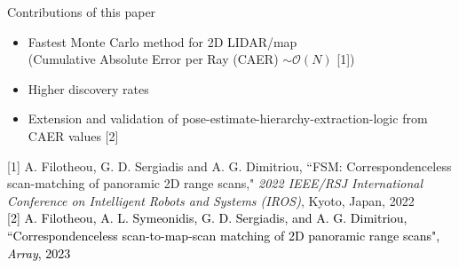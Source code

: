 \begin{frame}[noframenumbering]{Contributions of this paper}

  \begin{overlayarea}{\textwidth}{3cm}
  \leavevmode
    \begin{itemize}
      \item Fastest Monte Carlo method for 2D LIDAR/map \\
         (Cumulative Absolute Error per Ray (CAER) $\sim \mathcal{O}(N)$ [1])
      \item Higher discovery rates
      \item Extension and validation of pose-estimate-hierarchy-extraction-logic from CAER values [2]
    \end{itemize}




  \end{overlayarea}
  \placebottom \vspace{-1.0cm} \tiny {[1] A. Filotheou, G. D. Sergiadis and A. G. Dimitriou, ``FSM: Correspondenceless scan-matching of panoramic 2D range scans," \textit{2022 IEEE/RSJ International Conference on Intelligent Robots and Systems (IROS)}, Kyoto, Japan, 2022} \\ \textcolor{black}{[2] A. Filotheou, A. L. Symeonidis, G. D. Sergiadis, and A. G. Dimitriou, ``Correspondenceless scan-to-map-scan matching of 2D panoramic range scans", \textit{Array}, 2023}
\end{frame}
